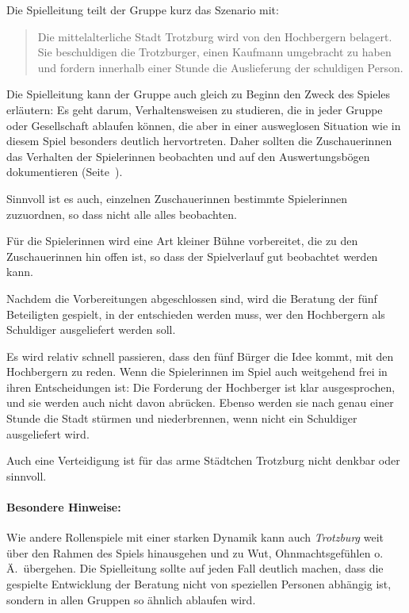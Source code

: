 Die Spielleitung teilt der Gruppe kurz das Szenario mit:
\begin{quote}
Die mittelalterliche Stadt Trotzburg wird von den Hochbergern belagert. Sie beschuldigen die Trotzburger, einen Kaufmann umgebracht zu haben und fordern innerhalb einer Stunde die Auslieferung der schuldigen Person.
\end{quote}

Die Spielleitung kann der Gruppe auch gleich zu Beginn den Zweck des Spieles erläutern:
Es geht darum, Verhaltensweisen zu studieren, die in jeder Gruppe oder Gesellschaft ablaufen können, die aber in einer ausweglosen Situation wie in diesem Spiel besonders deutlich hervortreten. Daher sollten die Zuschauerinnen das Verhalten der Spielerinnen beobachten und auf den Auswertungsbögen dokumentieren (Seite~\pageref{trotzburg-auswertung}).

Sinnvoll ist es auch, einzelnen Zuschauerinnen bestimmte Spielerinnen zuzuordnen, so dass nicht alle alles beobachten.

Für die Spielerinnen wird eine Art kleiner Bühne vorbereitet, die zu den Zuschauerinnen hin offen ist, so dass der Spielverlauf gut beobachtet werden kann.

Nachdem die Vorbereitungen abgeschlossen sind, wird die Beratung der fünf Beteiligten gespielt, in der entschieden werden muss, wer den Hochbergern als Schuldiger ausgeliefert werden soll.

Es wird relativ schnell passieren, dass den fünf Bürger die Idee kommt, mit den Hochbergern zu reden. Wenn die Spielerinnen im Spiel auch weitgehend frei in ihren Entscheidungen ist: Die Forderung der Hochberger ist klar ausgesprochen, und sie werden auch nicht davon abrücken.
Ebenso werden sie nach genau einer Stunde die Stadt stürmen und niederbrennen, wenn nicht ein Schuldiger ausgeliefert wird.

Auch eine Verteidigung ist für das arme Städtchen Trotzburg nicht denkbar oder sinnvoll.

\paragraph{Besondere Hinweise:} Wie andere Rollenspiele mit einer starken Dynamik kann auch \emph{Trotzburg} weit über den Rahmen des Spiels hinausgehen und zu Wut, Ohnmachtsgefühlen o.\,Ä.~übergehen. Die Spielleitung sollte auf jeden Fall deutlich machen, dass die gespielte Entwicklung der Beratung nicht von speziellen Personen abhängig ist, sondern in allen Gruppen so ähnlich ablaufen wird.

